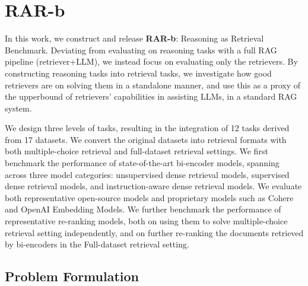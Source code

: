 \documentclass{article} %
\begin{document}
\section{RAR-b}

In this work, we construct and release \textbf{RAR-b}: Reasoning as Retrieval Benchmark. Deviating from evaluating on reasoning tasks with a full RAG pipeline (retriever+LLM), we instead focus on evaluating only the retrievers. By constructing reasoning tasks into retrieval tasks, we investigate how good retrievers are on solving them in a standalone manner, and use this as a proxy of the upperbound of retrievers' capabilities in assisting LLMs, in a standard RAG system.

We design three levels of tasks, resulting in the integration of 12 tasks derived from 17 datasets. We convert the original datasets into retrieval formats with both multiple-choice retrieval and full-dataset retrieval settings. 
We first benchmark the performance of state-of-the-art bi-encoder models,
spanning across three model categories: unsupervised dense retrieval models, supervised dense retrieval models, and instruction-aware dense retrieval models. We evaluate both representative open-source models and proprietary models such as Cohere and OpenAI Embedding Models. We further benchmark the performance of representative re-ranking models, both on using them to solve multiple-choice retrieval setting independently, and on
further re-ranking the documents retrieved by bi-encoders in the Full-dataset retrieval setting.

\subsection{Problem Formulation}
\end{document}
